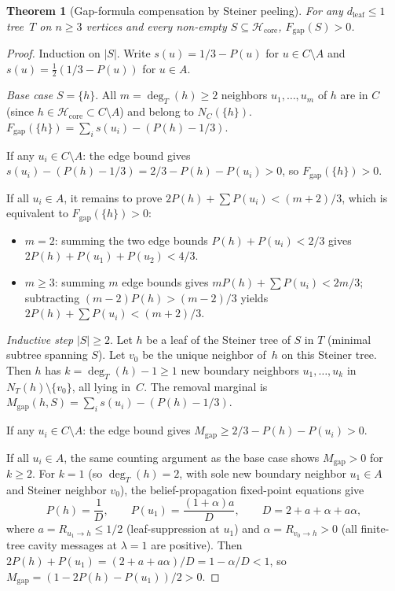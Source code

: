 \documentclass[12pt,oneside]{article}
\newtheorem{theorem}{Theorem}[section]
\theoremstyle{remark}
\newcommand{\dleaf}{d_{\mathrm{leaf}}}    %
\begin{document}
\begin{theorem}[Gap-formula compensation by Steiner peeling]\label{thm:steiner-peeling}
For any $\dleaf \le 1$ tree~$T$ on $n\ge3$ vertices and every non-empty $S \subseteq \mathcal H_{\mathrm{core}}$, $F_{\mathrm{gap}}(S) > 0$.
\end{theorem}

\begin{proof}
Induction on $|S|$.
Write $s(u) = 1/3 - P(u)$ for $u \in C \setminus A$ and $s(u) = \tfrac{1}{2}(1/3 - P(u))$ for $u \in A$.

\textit{Base case} $S = \{h\}$.
All $m = \deg_T(h) \ge 2$ neighbors $u_1, \ldots, u_m$ of $h$ are in $C$ (since $h \in \mathcal H_{\mathrm{core}} \subset C \setminus A$) and belong to $N_C(\{h\})$.
$F_{\mathrm{gap}}(\{h\}) = \sum_i s(u_i) - (P(h) - 1/3)$.

If any $u_i \in C \setminus A$: the edge bound gives $s(u_i) - (P(h) - 1/3) = 2/3 - P(h) - P(u_i) > 0$, so $F_{\mathrm{gap}}(\{h\}) > 0$.

If all $u_i \in A$, it remains to prove $2P(h) + \sum P(u_i) < (m+2)/3$, which is equivalent to $F_{\mathrm{gap}}(\{h\}) > 0$:
\begin{itemize}
  \item $m = 2$: summing the two edge bounds $P(h) + P(u_i) < 2/3$ gives $2P(h) + P(u_1) + P(u_2) < 4/3$.
  \item $m \ge 3$: summing $m$ edge bounds gives $m P(h) + \sum P(u_i) < 2m/3$; subtracting $(m-2)P(h) > (m-2)/3$ yields $2P(h) + \sum P(u_i) < (m+2)/3$.
\end{itemize}

\textit{Inductive step} $|S| \ge 2$.
Let $h$ be a leaf of the Steiner tree of $S$ in $T$ (minimal subtree spanning $S$).
Let $v_0$ be the unique neighbor of~$h$ on this Steiner tree.
Then $h$ has $k = \deg_T(h) - 1 \ge 1$ new boundary neighbors $u_1, \ldots, u_k$ in $N_T(h)\setminus\{v_0\}$, all lying in~$C$.
The removal marginal is $M_{\mathrm{gap}}(h, S) = \sum_i s(u_i) - (P(h) - 1/3)$.

If any $u_i \in C \setminus A$: the edge bound gives $M_{\mathrm{gap}} \ge 2/3 - P(h) - P(u_i) > 0$.

If all $u_i \in A$, the same counting argument as the base case shows $M_{\mathrm{gap}} > 0$ for $k \ge 2$.
For $k = 1$ (so $\deg_T(h) = 2$, with sole new boundary neighbor $u_1\in A$ and Steiner neighbor $v_0$), the belief-propagation fixed-point equations give
\[
  P(h) = \frac{1}{D}, \qquad P(u_1) = \frac{(1 + \alpha)a}{D}, \qquad D = 2 + a + \alpha + a\alpha,
\]
where $a = R_{u_1 \to h} \le 1/2$ (leaf-suppression at $u_1$) and $\alpha = R_{v_0 \to h} > 0$ (all finite-tree cavity messages at $\lambda = 1$ are positive).
Then $2P(h) + P(u_1) = (2 + a + a\alpha)/D = 1 - \alpha/D < 1$, so $M_{\mathrm{gap}} = (1 - 2P(h) - P(u_1))/2 > 0$.


\end{proof}
\end{document}

